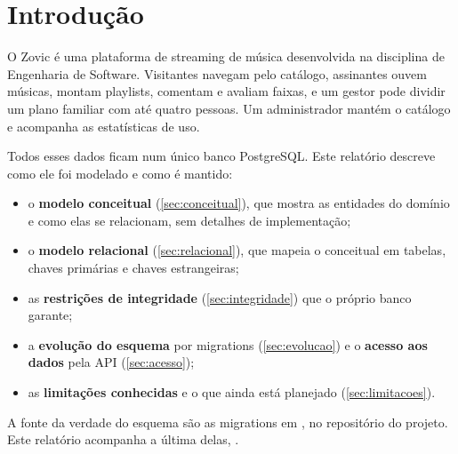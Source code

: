 \section{Introdução}

O Zovic é uma plataforma de streaming de música desenvolvida na disciplina de
Engenharia de Software. Visitantes navegam pelo catálogo, assinantes ouvem
músicas, montam playlists, comentam e avaliam faixas, e um gestor pode dividir
um plano familiar com até quatro pessoas. Um administrador mantém o catálogo e
acompanha as estatísticas de uso.

Todos esses dados ficam num único banco PostgreSQL. Este relatório descreve
como ele foi modelado e como é mantido:

\begin{itemize}
  \item o \textbf{modelo conceitual} (\cref{sec:conceitual}), que mostra as
    entidades do domínio e como elas se relacionam, sem detalhes de
    implementação;
  \item o \textbf{modelo relacional} (\cref{sec:relacional}), que mapeia o
    conceitual em tabelas, chaves primárias e chaves estrangeiras;
  \item as \textbf{restrições de integridade} (\cref{sec:integridade}) que o
    próprio banco garante;
  \item a \textbf{evolução do esquema} por migrations (\cref{sec:evolucao}) e
    o \textbf{acesso aos dados} pela API (\cref{sec:acesso});
  \item as \textbf{limitações conhecidas} e o que ainda está planejado
    (\cref{sec:limitacoes}).
\end{itemize}

A fonte da verdade do esquema são as migrations em , no
repositório do projeto. Este relatório acompanha a última delas,
.
